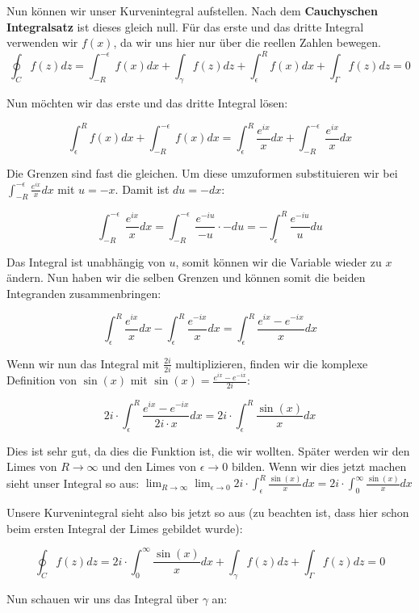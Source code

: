 \documentclass[12pt]{amsart}
\begin{document}
Nun können wir unser Kurvenintegral aufstellen. Nach dem \textbf{Cauchyschen Integralsatz} ist dieses gleich null. Für das erste und das dritte Integral verwenden wir $f(x)$, da wir uns hier nur über die reellen Zahlen bewegen. $$\oint_{C}f(z) dz = \int_{-R}^{-\epsilon} f(x) dx + \int_\gamma f(z) dz + \int_\epsilon^R f(x) dx + \int_\Gamma f(z) dz = 0$$

Nun möchten wir das erste und das dritte Integral lösen:

$$ \int_\epsilon^R f(x) dx + \int_{-R}^{-\epsilon} f(x) dx = \int_\epsilon^R \frac{e^{ix}}{x} dx + \int_{-R}^{-\epsilon} \frac{e^{ix}}{x} dx$$

Die Grenzen sind fast die gleichen. Um diese umzuformen substituieren wir bei $\int_{-R}^{-\epsilon} \frac{e^{ix}}{x} dx$ mit $u = -x$. Damit ist $du = -dx$:

$$\int_{-R}^{-\epsilon} \frac{e^{ix}}{x} dx = \int_{-R}^{-\epsilon} \frac{e^{-iu}}{-u} \cdot -du = - \int_{\epsilon}^{R} \frac{e^{-iu}}{u} du$$

Das Integral ist unabhängig von $u$, somit können wir die Variable wieder zu $x$ ändern. Nun haben wir die selben Grenzen und können somit die beiden Integranden zusammenbringen: 

$$\int_\epsilon^R \frac{e^{ix}}{x} dx - \int_\epsilon^R \frac{e^{-ix}}{x} dx = \int_\epsilon^R \frac{e^{ix}-e^{-ix}}{x} dx$$

Wenn wir nun das Integral mit $\frac{2i}{2i}$ multiplizieren, finden wir die komplexe Definition von $\sin{(x)}$ mit $\sin{(x)} = \frac{e^{ix}- e^{-ix}}{2i}$:

$$2i\cdot \int_\epsilon^R \frac{e^{ix}-e^{-ix}}{2i\cdot x} dx = 2i \cdot \int_\epsilon^R \frac{\sin{(x)}}{x} dx$$

Dies ist sehr gut, da dies die Funktion ist, die wir wollten. Später werden wir den Limes von $R \to \infty$ und den Limes von $\epsilon \to 0$ bilden. Wenn wir dies jetzt machen sieht unser Integral so aus: $\lim_{R \to \infty} \lim_{\epsilon \to 0} 2i \cdot \int_\epsilon^R \frac{\sin{(x)}}{x} dx = 2i \cdot \int_0^\infty \frac{\sin{(x)}}{x} dx$

\smallskip

Unsere Kurvenintegral sieht also bis jetzt so aus (zu beachten ist, dass hier schon beim ersten Integral der Limes gebildet wurde):

$$\oint_{C}f(z) dz = 2i \cdot \int_0^\infty \frac{\sin{(x)}}{x} dx + \int_\gamma f(z) dz + \int_\Gamma f(z) dz = 0$$

Nun schauen wir uns das Integral über $\gamma$ an: 
\end{document}

